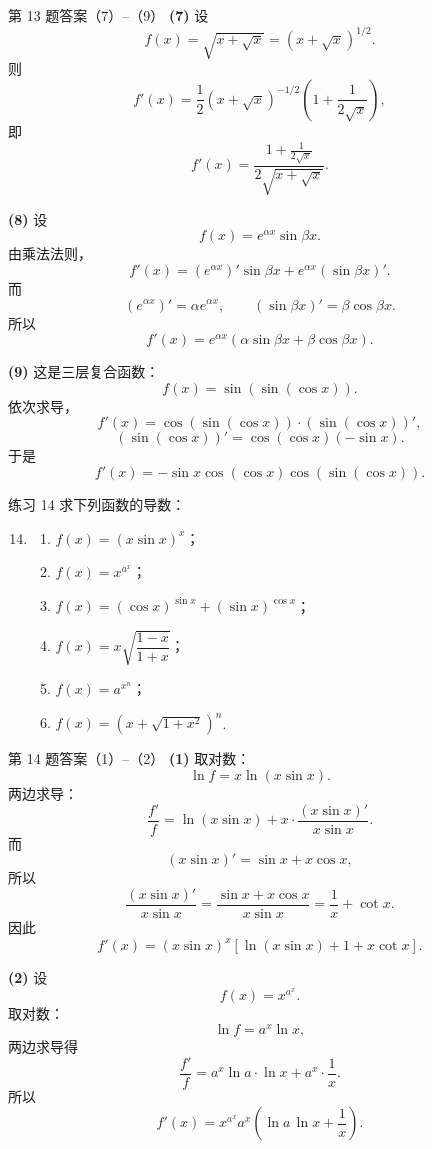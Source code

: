 ﻿\documentclass[aspectratio=169,11pt]{ctexbeamer}
\begin{document}
\begin{frame}[allowframebreaks]{第 13 题答案（7）--（9）}
\scriptsize
\textbf{(7)} 设
\[
f(x)=\sqrt{x+\sqrt x}=(x+\sqrt x)^{1/2}.
\]
则
\[
f'(x)=\frac12(x+\sqrt x)^{-1/2}\left(1+\frac1{2\sqrt x}\right),
\]
即
\[
f'(x)=\frac{1+\frac{1}{2\sqrt x}}{2\sqrt{x+\sqrt x}}.
\]

\textbf{(8)} 设
\[
f(x)=e^{\alpha x}\sin\beta x.
\]
由乘法法则，
\[
f'(x)=(e^{\alpha x})'\sin\beta x+e^{\alpha x}(\sin\beta x)'.
\]
而
\[
(e^{\alpha x})'=\alpha e^{\alpha x},\qquad
(\sin\beta x)'=\beta\cos\beta x.
\]
所以
\[
f'(x)=e^{\alpha x}(\alpha\sin\beta x+\beta\cos\beta x).
\]

\textbf{(9)} 这是三层复合函数：
\[
f(x)=\sin(\sin(\cos x)).
\]
依次求导，
\[
f'(x)=\cos(\sin(\cos x))\cdot (\sin(\cos x))',
\]
\[
(\sin(\cos x))'=\cos(\cos x)(-\sin x).
\]
于是
\[
f'(x)=-\sin x\cos(\cos x)\cos(\sin(\cos x)).
\]
\end{frame}

\begin{frame}{练习 14}
\scriptsize
求下列函数的导数：
\begin{enumerate}
\setcounter{enumi}{13}
\item
\begin{enumerate}
\item $f(x)=(x\sin x)^x$；
\item $f(x)=x^{a^x}$；
\item $f(x)=(\cos x)^{\sin x}+(\sin x)^{\cos x}$；
\item $f(x)=x\sqrt{\dfrac{1-x}{1+x}}$；
\item $f(x)=a^{x^n}$；
\item $f(x)=(x+\sqrt{1+x^2})^n$.
\end{enumerate}
\end{enumerate}
\end{frame}

\begin{frame}[allowframebreaks]{第 14 题答案（1）--（2）}
\scriptsize
\textbf{(1)} 取对数：
\[
\ln f=x\ln(x\sin x).
\]
两边求导：
\[
\frac{f'}{f}=\ln(x\sin x)+x\cdot\frac{(x\sin x)'}{x\sin x}.
\]
而
\[
(x\sin x)'=\sin x+x\cos x,
\]
所以
\[
\frac{(x\sin x)'}{x\sin x}
=\frac{\sin x+x\cos x}{x\sin x}
=\frac1x+\cot x.
\]
因此
\[
f'(x)=(x\sin x)^x[\ln(x\sin x)+1+x\cot x].
\]

\textbf{(2)} 设
\[
f(x)=x^{a^x}.
\]
取对数：
\[
\ln f=a^x\ln x,
\]
两边求导得
\[
\frac{f'}{f}=a^x\ln a\cdot \ln x+a^x\cdot\frac1x.
\]
所以
\[
f'(x)=x^{a^x}a^x\left(\ln a\,\ln x+\frac1x\right).
\]
\end{frame}
\end{document}
